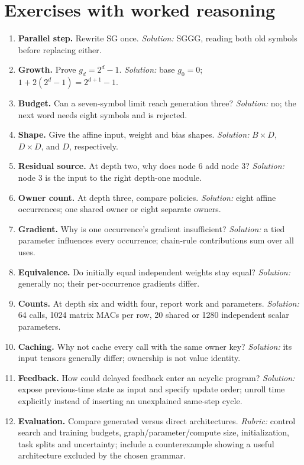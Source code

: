 \section{Exercises with worked reasoning}
\begin{enumerate}
\item \textbf{Parallel step.} Rewrite SG once.
 \emph{Solution:} SGGG, reading both old symbols before replacing either.
\item \textbf{Growth.} Prove $g_d=2^d-1$.
 \emph{Solution:} base $g_0=0$; $1+2(2^d-1)=2^{d+1}-1$.
\item \textbf{Budget.} Can a seven-symbol limit reach generation three?
 \emph{Solution:} no; the next word needs eight symbols and is rejected.
\item \textbf{Shape.} Give the affine input, weight and bias shapes.
 \emph{Solution:} $B\times D$, $D\times D$, and $D$, respectively.
\item \textbf{Residual source.} At depth two, why does node 6 add node 3?
 \emph{Solution:} node 3 is the input to the right depth-one module.
\item \textbf{Owner count.} At depth three, compare policies.
 \emph{Solution:} eight affine occurrences; one shared owner or eight separate owners.
\item \textbf{Gradient.} Why is one occurrence's gradient insufficient?
 \emph{Solution:} a tied parameter influences every occurrence; chain-rule
 contributions sum over all uses.
\item \textbf{Equivalence.} Do initially equal independent weights stay equal?
 \emph{Solution:} generally no; their per-occurrence gradients differ.
\item \textbf{Counts.} At depth six and width four, report work and parameters.
 \emph{Solution:} 64 calls, 1024 matrix MACs per row, 20 shared or 1280
 independent scalar parameters.
\item \textbf{Caching.} Why not cache every call with the same owner key?
 \emph{Solution:} its input tensors generally differ; ownership is not value identity.
\item \textbf{Feedback.} How could delayed feedback enter an acyclic program?
 \emph{Solution:} expose previous-time state as input and specify update order;
 unroll time explicitly instead of inserting an unexplained same-step cycle.
\item \textbf{Evaluation.} Compare generated versus direct architectures.
 \emph{Rubric:} control search and training budgets, graph/parameter/compute
 size, initialization, task splits and uncertainty; include a counterexample
 showing a useful architecture excluded by the chosen grammar.
\end{enumerate}
